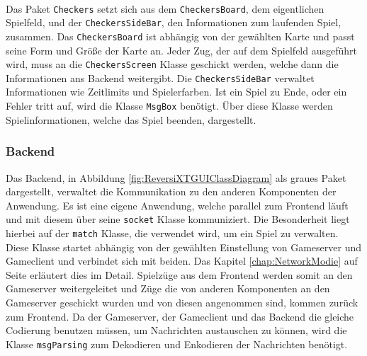 \documentclass[12pt,a4paper,bibliography=totocnumbered,listof=totocnumbered]{article}
\begin{document}
\\
Das Paket \texttt{Checkers} setzt sich aus dem \texttt{CheckersBoard}, dem eigentlichen Spielfeld, und der \texttt{CheckersSideBar}, den Informationen zum laufenden Spiel, zusammen. 
Das \texttt{CheckersBoard} ist abhängig von der gewählten Karte und passt seine Form und Größe der Karte an. Jeder Zug, der auf dem Spielfeld ausgeführt wird, muss an 
die \texttt{CheckersScreen} Klasse geschickt werden, welche dann die Informationen ans Backend weitergibt.
Die \texttt{CheckersSideBar} verwaltet Informationen wie Zeitlimits und Spielerfarben. 
Ist ein Spiel zu Ende, oder ein Fehler tritt auf, wird die Klasse \texttt{MsgBox} benötigt. Über diese Klasse werden Spielinformationen, welche das Spiel beenden, 
dargestellt.

\subsubsection{Backend}
Das Backend, in Abbildung \ref{fig:ReversiXTGUIClassDiagram} als graues Paket dargestellt, verwaltet die Kommunikation zu den anderen Komponenten der Anwendung.
Es ist eine eigene Anwendung, welche parallel zum Frontend läuft und mit diesem über seine \texttt{socket} Klasse kommuniziert.
Die Besonderheit liegt hierbei auf der \texttt{match} Klasse, die verwendet wird, um ein Spiel zu verwalten. 
Diese Klasse startet abhängig von der gewählten Einstellung von Gameserver und Gameclient und verbindet sich mit beiden. Das Kapitel \ref{chap:NetworkModie} auf 
Seite \pageref{chap:NetworkModie} erläutert dies im Detail. Spielzüge aus dem Frontend werden somit 
an den Gameserver weitergeleitet und Züge die von anderen Komponenten an den Gameserver geschickt wurden und von diesen angenommen sind, kommen zurück zum Frontend.
Da der Gameserver, der Gameclient und das Backend die gleiche Codierung benutzen müssen, um Nachrichten austauschen zu können, wird 
die Klasse \texttt{msgParsing} zum Dekodieren und Enkodieren der Nachrichten benötigt.
\end{document}
